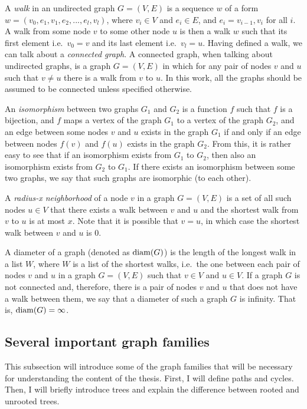 A \emph{walk} in an undirected graph $G = (V, E)$ is a sequence $w$ of a form
$w = (v_0, e_1, v_1, e_2, ..., e_l, v_l)$,
where $v_i \in V$ and $e_i \in E$, and $e_i = {v_{i-1}, v_i}$ for all $i$. A walk from some
node $v$ to some other node $u$ is then a walk $w$ such that its first element i.e.\ $v_0 = v$
and its last element i.e.\ $v_l = u$. Having defined a walk, we can talk about a \emph{
connected graph}. A connected graph, when talking about undirected
graphs, is a graph $G = (V, E)$ in which for any pair of nodes $v$ and $u$ such that
$v \neq u$ there is a walk from $v$ to $u$. In this work, all the graphs
should be assumed to be connected unless specified otherwise.

An \emph{isomorphism} between two graphs $G_1$ and $G_2$ is a function $f$ such that $f$ is a 
bijection, and $f$ maps a vertex of the graph $G_1$ to a vertex of the graph $G_2$, and 
an edge between some nodes $v$ and $u$ exists in the graph $G_1$ if and only if
an edge between nodes $f(v)$ and $f(u)$ exists in the graph $G_2$. From this,
it is rather easy to see that if an isomorphism exists from $G_1$ to $G_2$, then
also an isomorphism exists from $G_2$ to $G_1$. If there exists an
isomorphism between some two graphs, we say that such graphs are isomorphic
(to each other).

A \emph{radius-x neighborhood} of a node $v$ in a graph $G = (V, E)$ is a set of
all such nodes $u \in V$ that there exists a walk between $v$ and $u$ and 
the shortest walk from $v$ to $u$ is at most $x$. Note that it is possible that
$v = u$, in which case the shortest walk between $v$ and $u$ is 0.

A diameter of a graph (denoted as $\operatorname{diam}(G)$) is the length of the longest walk
in a list $W$, where $W$ is a list of the shortest walks, i.e.\ the one between each pair of nodes
$v$ and $u$ in a graph $G = (V, E)$ such that $v \in V$ and $u \in V$. If a graph
$G$ is not connected and, therefore, there is a pair of nodes $v$ and $u$ that does not
have a walk between them, we say that a diameter of such a graph $G$ is infinity. That
is, $\operatorname{diam}(G) = \infty$.

\subsection{Several important graph families}

This subsection will introduce some of the graph families that will be necessary
for understanding the content of the thesis. First, I will define paths and cycles.
Then, I will briefly introduce trees and explain the difference between rooted
and unrooted trees.

